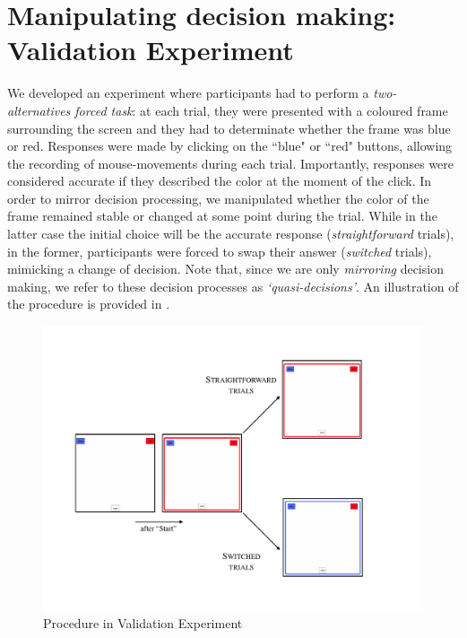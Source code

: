 \documentclass{article}
\begin{document}
\section{Manipulating decision making: Validation Experiment}

We developed an experiment where participants had to perform a \emph{two-alternatives forced task}: at each trial, they were presented with a coloured frame surrounding the screen and they had to determinate whether the frame was blue or red. 
Responses were made by clicking on the ``blue" or ``red" buttons, allowing the recording of mouse-movements during each trial. Importantly, responses were considered accurate if they described the color at the moment of the click. 
In order to mirror decision processing, we manipulated whether the color of the frame remained stable or changed at some point during the trial. 
While in the latter case the initial choice will be the accurate response (\textit{straightforward} trials), in the former, participants were forced to swap their answer (\textit{switched} trials), mimicking a change of decision. Note that, since we are only \emph{mirroring} decision making, we refer to these decision processes as \emph{`quasi-decisions'}.   
An illustration of the procedure is provided in . 



\begin{figure}
\centering
\includegraphics[scale=.5]{procedure.pdf}
\caption{Procedure in Validation Experiment} \label{fig:procedure.example}
\end{figure}
\end{document}
